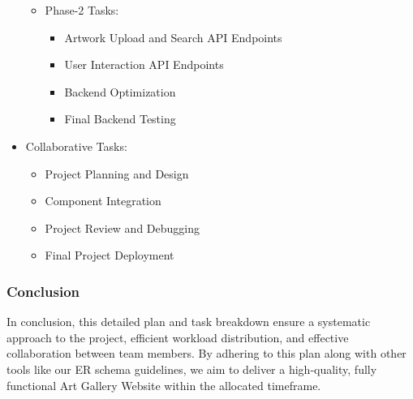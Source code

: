 \documentclass[11pt]{article}
\begin{document}
\begin{itemize}
\begin{itemize}
\item Phase-2 Tasks:
\begin{itemize}
\item Artwork Upload and Search API Endpoints
\item User Interaction API Endpoints
\item Backend Optimization
\item Final Backend Testing
\end{itemize}
\end{itemize}

\item Collaborative Tasks:

\begin{itemize}
\item Project Planning and Design
\item Component Integration
\item Project Review and Debugging
\item Final Project Deployment
\end{itemize}
\end{itemize}

\subsubsection{Conclusion}
\label{sec:orgbba319f}

In conclusion, this detailed plan and task breakdown ensure a systematic
approach to the project, efficient workload distribution, and effective
collaboration between team members. By adhering to this plan along with other
tools like our ER schema guidelines, we aim to deliver a high-quality, fully
functional Art Gallery Website within the allocated timeframe.
\end{document}
